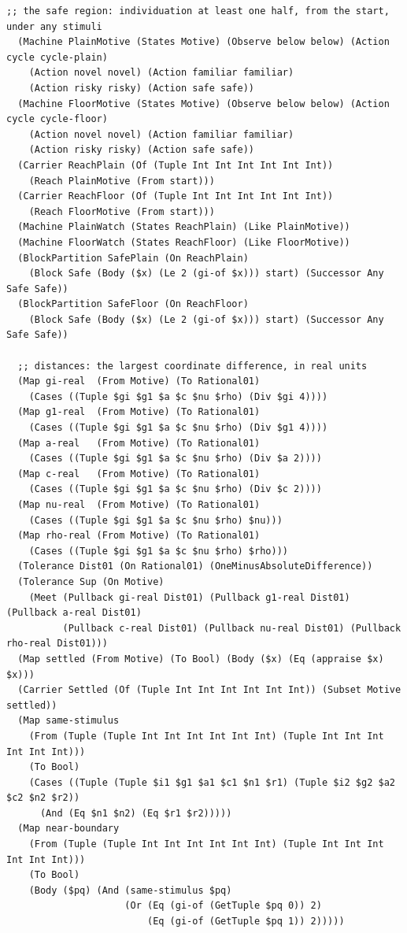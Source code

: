 \documentclass[11pt]{article}
\theoremstyle{definition}
\theoremstyle{plain}
\begin{document}
\begin{lstlisting}[style=mettamod]
  ;; the safe region: individuation at least one half, from the start, under any stimuli
  (Machine PlainMotive (States Motive) (Observe below below) (Action cycle cycle-plain)
    (Action novel novel) (Action familiar familiar)
    (Action risky risky) (Action safe safe))
  (Machine FloorMotive (States Motive) (Observe below below) (Action cycle cycle-floor)
    (Action novel novel) (Action familiar familiar)
    (Action risky risky) (Action safe safe))
  (Carrier ReachPlain (Of (Tuple Int Int Int Int Int Int))
    (Reach PlainMotive (From start)))
  (Carrier ReachFloor (Of (Tuple Int Int Int Int Int Int))
    (Reach FloorMotive (From start)))
  (Machine PlainWatch (States ReachPlain) (Like PlainMotive))
  (Machine FloorWatch (States ReachFloor) (Like FloorMotive))
  (BlockPartition SafePlain (On ReachPlain)
    (Block Safe (Body ($x) (Le 2 (gi-of $x))) start) (Successor Any Safe Safe))
  (BlockPartition SafeFloor (On ReachFloor)
    (Block Safe (Body ($x) (Le 2 (gi-of $x))) start) (Successor Any Safe Safe))

  ;; distances: the largest coordinate difference, in real units
  (Map gi-real  (From Motive) (To Rational01)
    (Cases ((Tuple $gi $g1 $a $c $nu $rho) (Div $gi 4))))
  (Map g1-real  (From Motive) (To Rational01)
    (Cases ((Tuple $gi $g1 $a $c $nu $rho) (Div $g1 4))))
  (Map a-real   (From Motive) (To Rational01)
    (Cases ((Tuple $gi $g1 $a $c $nu $rho) (Div $a 2))))
  (Map c-real   (From Motive) (To Rational01)
    (Cases ((Tuple $gi $g1 $a $c $nu $rho) (Div $c 2))))
  (Map nu-real  (From Motive) (To Rational01)
    (Cases ((Tuple $gi $g1 $a $c $nu $rho) $nu)))
  (Map rho-real (From Motive) (To Rational01)
    (Cases ((Tuple $gi $g1 $a $c $nu $rho) $rho)))
  (Tolerance Dist01 (On Rational01) (OneMinusAbsoluteDifference))
  (Tolerance Sup (On Motive)
    (Meet (Pullback gi-real Dist01) (Pullback g1-real Dist01) (Pullback a-real Dist01)
          (Pullback c-real Dist01) (Pullback nu-real Dist01) (Pullback rho-real Dist01)))
  (Map settled (From Motive) (To Bool) (Body ($x) (Eq (appraise $x) $x)))
  (Carrier Settled (Of (Tuple Int Int Int Int Int Int)) (Subset Motive settled))
  (Map same-stimulus
    (From (Tuple (Tuple Int Int Int Int Int Int) (Tuple Int Int Int Int Int Int)))
    (To Bool)
    (Cases ((Tuple (Tuple $i1 $g1 $a1 $c1 $n1 $r1) (Tuple $i2 $g2 $a2 $c2 $n2 $r2))
      (And (Eq $n1 $n2) (Eq $r1 $r2)))))
  (Map near-boundary
    (From (Tuple (Tuple Int Int Int Int Int Int) (Tuple Int Int Int Int Int Int)))
    (To Bool)
    (Body ($pq) (And (same-stimulus $pq)
                     (Or (Eq (gi-of (GetTuple $pq 0)) 2)
                         (Eq (gi-of (GetTuple $pq 1)) 2)))))


\end{lstlisting}
\end{document}
